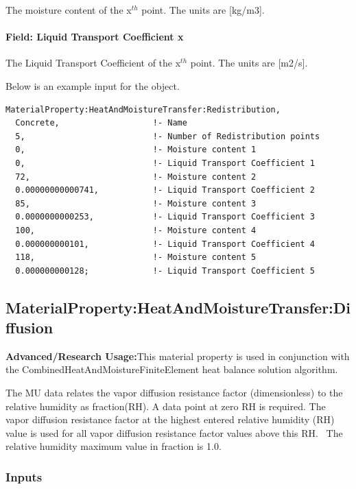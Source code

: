 The moisture content of the x\(^{th}\) point. The units are {[}kg/m3{]}.

\paragraph{Field: Liquid Transport Coefficient x}\label{field-liquid-transport-coefficient-x-1}

The Liquid Transport Coefficient of the x\(^{th}\) point. The units are {[}m2/s{]}.

Below is an example input for the object.

\begin{lstlisting}
MaterialProperty:HeatAndMoistureTransfer:Redistribution,
  Concrete,                   !- Name
  5,                          !- Number of Redistribution points
  0,                          !- Moisture content 1
  0,                          !- Liquid Transport Coefficient 1
  72,                         !- Moisture content 2
  0.00000000000741,           !- Liquid Transport Coefficient 2
  85,                         !- Moisture content 3
  0.0000000000253,            !- Liquid Transport Coefficient 3
  100,                        !- Moisture content 4
  0.000000000101,             !- Liquid Transport Coefficient 4
  118,                        !- Moisture content 5
  0.000000000128;             !- Liquid Transport Coefficient 5
\end{lstlisting}

\subsection{MaterialProperty:HeatAndMoistureTransfer:Diffusion}\label{materialpropertyheatandmoisturetransferdiffusion}

\textbf{Advanced/Research Usage:}This material property is used in conjunction with the CombinedHeatAndMoistureFiniteElement heat balance solution algorithm.

The MU data relates the vapor diffusion resistance factor (dimensionless) to the relative humidity as fraction(RH). A data point at zero RH is required. The vapor diffusion resistance factor at the highest entered relative humidity (RH) value is used for all vapor diffusion resistance factor values above this RH.~ The relative humidity maximum value in fraction is 1.0.

\subsubsection{Inputs}\label{inputs-11-019}

